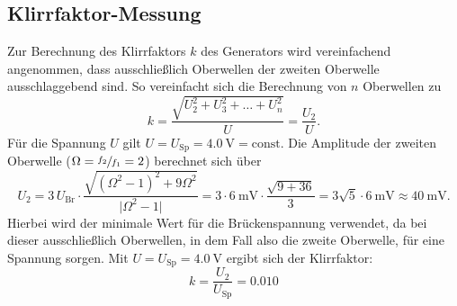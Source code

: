 \subsection{Klirrfaktor-Messung}
\label{klirr_sub}
\FloatBarrier
Zur Berechnung des Klirrfaktors $k$ des Generators wird vereinfachend angenommen, dass ausschließlich Oberwellen der 
zweiten Oberwelle ausschlaggebend sind. 
So vereinfacht sich die Berechnung von $n$ Oberwellen zu 
\begin{equation}
    k=\frac{\sqrt{U_2^2 + U_3^2 + \dotsc + U_n^2}}{U} = \frac{U_2}{U}.
\end{equation}
Für die Spannung $U$ gilt $U=U_\text{Sp}=\SI{4.0}{\volt}=\text{const}$. 
Die Amplitude der zweiten Oberwelle ($\Omega = \sfrac{f_2}{f_1} = 2$) berechnet sich über
\begin{equation}
    U_2=3 \, U_\text{Br} \cdot \frac{\sqrt{(\Omega ^2 -1)^2 + 9\Omega ^2}}{\lvert \Omega ^2 -1 \rvert}
        =3 \cdot \SI{6}{\milli\volt} \cdot \frac{\sqrt{9 + 36}}{3}=3 \sqrt{5} \cdot \SI{6}{\milli\volt} \approx \SI{40}{\milli\volt} .
\end{equation}
Hierbei wird der minimale Wert für die Brückenspannung verwendet, da bei dieser ausschließlich Oberwellen, in dem Fall also die zweite Oberwelle, für eine Spannung sorgen. 
Mit $U=U_\text{Sp}=\SI{4.0}{\volt}$ ergibt sich der Klirrfaktor:
\begin{equation}
    k=\frac{U_2}{U_\text{Sp}}=0.010
\end{equation}

